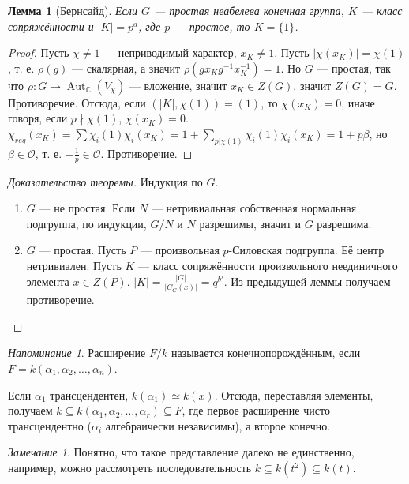 \documentclass{article}
\newtheorem*{lemma}{Лемма}
\theoremstyle{definition}
\theoremstyle{remark}
\newtheorem*{reminder}{Напоминание}
\newtheorem*{remark}{Замечание}
\DeclareMathOperator{\Aut}{Aut}
\renewcommand{\O}{\mathcal{O}}
\renewcommand{\C}{\mathbb{C}}
\begin{document}
\begin{lemma}[Бернсайд]
	Если $G$ --- простая неабелева конечная группа, $K$ --- класс сопряжённости и $|K| = p^a$, где $p$ --- простое, то $K = \{1\}$.
\end{lemma}
\begin{proof}
	Пусть $\chi \neq 1$ --- неприводимый характер, $x_K \neq 1$. Пусть $|\chi(x_K)| = \chi(1)$, т. е. $\rho(g)$ --- скалярная, а значит $\rho(gx_Kg^{-1}x_K^{-1}) = 1$. Но $G$ --- простая, так что $\rho: G \rightarrow \Aut_\C(V_\chi)$ --- вложение, значит $x_K \in Z(G)$, значит $Z(G) = G$. Противоречие.
	Отсюда, если $(|K|, \chi(1)) = (1)$, то $\chi(x_K) = 0$, иначе говоря, если $p \nmid \chi(1)$, $\chi(x_K) = 0$. $\chi_{reg}(x_K) = \sum \chi_i(1) \chi_i(x_K) = 1 + \sum\limits_{p | \chi(1)} \chi_i(1) \chi_i(x_K) = 1 + p \beta$, но $\beta \in \O$, т. е. $-\frac{1}{p} \in \O$. Противоречие.
\end{proof}

\begin{proof}[Доказательство теоремы]
	Индукция по $G$.
	\begin{enumerate}
	\item $G$ --- не простая. Если $N$ --- нетривиальная собственная нормальная подгруппа, по индукции, $G / N$ и $N$ разрешимы, значит и $G$ разрешима.
	\item $G$ --- простая. Пусть $P$ --- произвольная $p$-Силовская подгруппа. Её центр нетривиален. Пусть $K$ --- класс сопряжённости произвольного неединичного элемента $x \in Z(P)$. $|K| = \frac{|G|}{|C_G(x)|} = q^{b'}$. Из предыдущей леммы получаем противоречие.
	\end{enumerate}
\end{proof}

\begin{reminder}
	Расширение $F/k$ называется конечнопорождённым, если $F = k(\alpha_1, \alpha_2, \ldots, \alpha_n)$.
\end{reminder}
	Если $\alpha_1$ трансцендентен, $k(\alpha_1) \simeq k(x)$. Отсюда, переставляя элементы, получаем $k \subseteq k(\alpha_1, \alpha_2, \ldots, \alpha_r) \subseteq F$, где первое расширение чисто трансцендентно ($\alpha_i$ алгебраически независимы), а второе конечно.
\begin{remark}
	Понятно, что такое представление далеко не единственно, например, можно рассмотреть последовательность $k \subseteq k(t^2) \subseteq k(t)$.
\end{remark}
\end{document}
